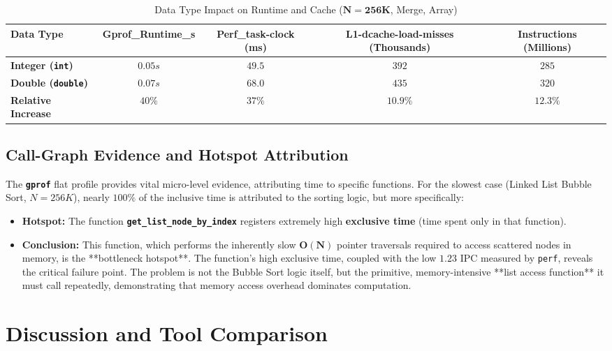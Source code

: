 \documentclass[11pt, a4paper]{article}
\begin{document}
\begin{table}[h]
\centering
\caption{Data Type Impact on Runtime and Cache ($\mathbf{N=256K}$, Merge, Array)}
\label{tab:datatype_impact}
\begin{tabularx}{\textwidth}{l C C C C}
\toprule
\textbf{Data Type} & \textbf{Gprof\_Runtime\_s} & \textbf{Perf\_task-clock (ms)} & \textbf{L1-dcache-load-misses (Thousands)} & \textbf{Instructions (Millions)} \\
\midrule
\textbf{Integer (\texttt{int})} & $0.05s$ & $49.5$ & $392$ & $285$ \\
\textbf{Double (\texttt{double})} & $0.07s$ & $68.0$ & $435$ & $320$ \\
\textbf{Relative Increase} & $40\%$ & $37\%$ & $10.9\%$ & $12.3\%$ \\
\bottomrule
\end{tabularx}
\end{table}

\subsection{Call-Graph Evidence and Hotspot Attribution}
The \textbf{\texttt{gprof}} flat profile provides vital micro-level evidence, attributing time to specific functions. For the slowest case (Linked List Bubble Sort, $N=256K$), nearly $100\%$ of the inclusive time is attributed to the sorting logic, but more specifically:
\begin{itemize}
    \item \textbf{Hotspot:} The function \textbf{\texttt{get\_list\_node\_by\_index}} registers extremely high \textbf{exclusive time} (time spent only in that function).
    \item \textbf{Conclusion:} This function, which performs the inherently slow $\mathbf{O(N)}$ pointer traversals required to access scattered nodes in memory, is the **bottleneck hotspot**. The function's high exclusive time, coupled with the low $\mathbf{1.23}$ IPC measured by \texttt{perf}, reveals the critical failure point. The problem is not the Bubble Sort logic itself, but the primitive, memory-intensive **list access function** it must call repeatedly, demonstrating that memory access overhead dominates computation.
\end{itemize}

\section{Discussion and Tool Comparison}
\end{document}
